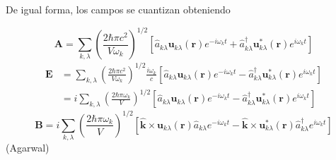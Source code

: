 De igual forma, los campos se cuantizan obteniendo

\begin{equation*}
\mathbf{A} =  \sum_{k,\lambda} \left( \frac{2\hbar \pi c^2}{V\omega_k} \right)^{1/2} \left[ \hat{a}_{k\lambda} \mathbf{u}_{k\lambda} (\mathbf{r})e^{-i\omega_k t} + \hat{a}^{\dagger}_{k\lambda} \mathbf{u}_{k\lambda}^* (\mathbf{r})e^{i\omega_{k} t} \right]
\end{equation*}
\begin{align*}
\mathbf{E} & = \sum_{k,\lambda} \left( \frac{2\hbar \pi c^2}{V\omega_k} \right)^{1/2} \frac{i\omega_{k}}{c} \left[ \hat{a}_{k\lambda} \mathbf{u}_{k\lambda} (\mathbf{r})e^{-i\omega_k t} -  \hat{a}^{\dagger}_{k\lambda} \mathbf{u}_{k\lambda}^* (\mathbf{r})e^{i\omega_{k} t} \right] \\
& = i \sum_{k,\lambda} \left( \frac{2\hbar \pi \omega_k}{V} \right)^{1/2} \left[ \hat{a}_{k\lambda} \mathbf{u}_{k\lambda} (\mathbf{r})e^{-i\omega_k t} -  \hat{a}^{\dagger}_{k\lambda} \mathbf{u}_{k\lambda}^* (\mathbf{r})e^{i\omega_{k} t} \right]
\end{align*}
\begin{equation*}
\mathbf{B} = i \sum_{k,\lambda} \left( \frac{2\hbar \pi \omega_k}{V} \right)^{1/2} \left[ \mathbf{\hat{k}} \times \mathbf{u}_{k\lambda}(\mathbf{r}) \hat{a}_{k\lambda} e^{-i\omega_k t} - \mathbf{\hat{k}} \times \mathbf{u}_{k\lambda}^* (\mathbf{r}) \hat{a}^{\dagger}_{k\lambda} e^{i\omega_{k} t} \right]
\end{equation*} (Agarwal)









